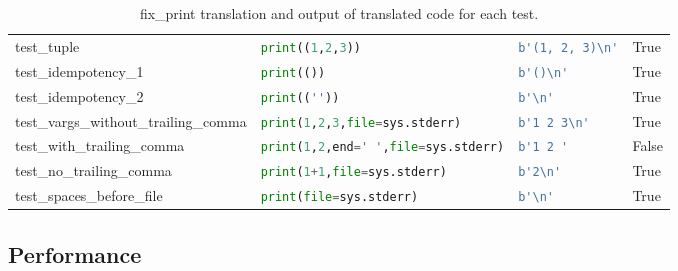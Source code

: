 \begin{table}[h!]
\begin{tabular}{@{}l|lll@{}}
    test\_tuple                           & \lstinline[language=Python, style=pythonstyle]|print((1,2,3))                    | & \lstinline[language=Python, style=pythonstyle]|b'(1, 2, 3)\n'| & True                      \\
    test\_idempotency\_1                  & \lstinline[language=Python, style=pythonstyle]|print(())                         | & \lstinline[language=Python, style=pythonstyle]|b'()\n'       | & True                      \\
    test\_idempotency\_2                  & \lstinline[language=Python, style=pythonstyle]|print((''))                       | & \lstinline[language=Python, style=pythonstyle]|b'\n'         | & True                      \\
    test\_vargs\_without\_trailing\_comma & \lstinline[language=Python, style=pythonstyle]|print(1,2,3,file=sys.stderr)      | & \lstinline[language=Python, style=pythonstyle]|b'1 2 3\n'    | & True                      \\
    test\_with\_trailing\_comma           & \lstinline[language=Python, style=pythonstyle]|print(1,2,end=' ',file=sys.stderr)| & \lstinline[language=Python, style=pythonstyle]|b'1 2 '       |                & False                     \\
    test\_no\_trailing\_comma             & \lstinline[language=Python, style=pythonstyle]|print(1+1,file=sys.stderr)        | & \lstinline[language=Python, style=pythonstyle]|b'2\n'        | & True                      \\
    test\_spaces\_before\_file            & \lstinline[language=Python, style=pythonstyle]|print(file=sys.stderr)            | & \lstinline[language=Python, style=pythonstyle]|b'\n'         | & True                      \\ \bottomrule
    \end{tabular}
    \caption{fix\_print translation and output of translated code for each test.}
    \label{table:fix_print-accuracy}
\end{table}

\subsection{Performance}

